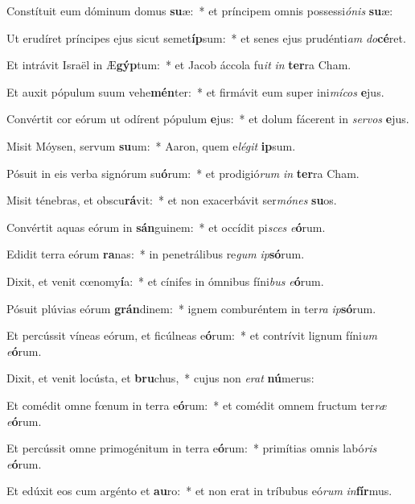 \item Constítuit eum dóminum domus \textbf{su}æ:~* et príncipem omnis possessi\textit{ó}\textit{nis} \textbf{su}æ:
\item Ut erudíret príncipes ejus sicut semet\textbf{íp}sum:~* et senes ejus prudénti\textit{am} \textit{do}\textbf{cé}ret.
\item Et intrávit Israël in Æ\textbf{gýp}tum:~* et Jacob áccola fu\textit{it} \textit{in} \textbf{ter}ra Cham.
\item Et auxit pópulum suum vehe\textbf{mén}ter:~* et firmávit eum super ini\textit{mí}\textit{cos} \textbf{e}jus.
\item Convértit cor eórum ut odírent pópulum \textbf{e}jus:~* et dolum fácerent in \textit{ser}\textit{vos} \textbf{e}jus.
\item Misit Móysen, servum \textbf{su}um:~* Aaron, quem e\textit{lé}\textit{git} \textbf{ip}sum.
\item Pósuit in eis verba signórum su\textbf{ó}rum:~* et prodigió\textit{rum} \textit{in} \textbf{ter}ra Cham.
\item Misit ténebras, et obscu\textbf{rá}vit:~* et non exacerbávit ser\textit{mó}\textit{nes} \textbf{su}os.
\item Convértit aquas eórum in \textbf{sán}guinem:~* et occídit pi\textit{sces} \textit{e}\textbf{ó}rum.
\item Edidit terra eórum \textbf{ra}nas:~* in penetrálibus re\textit{gum} \textit{ip}\textbf{só}rum.
\item Dixit, et venit cœnomy\textbf{í}a:~* et cínifes in ómnibus fíni\textit{bus} \textit{e}\textbf{ó}rum.
\item Pósuit plúvias eórum \textbf{grán}dinem:~* ignem comburéntem in ter\textit{ra} \textit{ip}\textbf{só}rum.
\item Et percússit víneas eórum, et ficúlneas e\textbf{ó}rum:~* et contrívit lignum fíni\textit{um} \textit{e}\textbf{ó}rum.
\item Dixit, et venit locústa, et \textbf{bru}chus,~* cujus non \textit{e}\textit{rat} \textbf{nú}merus:
\item Et comédit omne fœnum in terra e\textbf{ó}rum:~* et comédit omnem fructum ter\textit{ræ} \textit{e}\textbf{ó}rum.
\item Et percússit omne primogénitum in terra e\textbf{ó}rum:~* primítias omnis labó\textit{ris} \textit{e}\textbf{ó}rum.
\item Et edúxit eos cum argénto et \textbf{au}ro:~* et non erat in tríbubus eó\textit{rum} \textit{in}\textbf{fír}mus.

